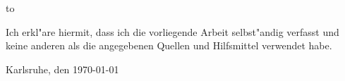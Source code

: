 \begin{otherlanguage}{ngerman}
\thispagestyle{empty}
\vspace*{35\baselineskip}
\hbox to \textwidth{\hrulefill}
\par
\noindent Ich erkl"are hiermit, dass ich die vorliegende Arbeit selbst"andig verfasst und
keine anderen als die angegebenen Quellen und Hilfsmittel verwendet habe.

\noindent Karlsruhe, den \today
\end{otherlanguage}
